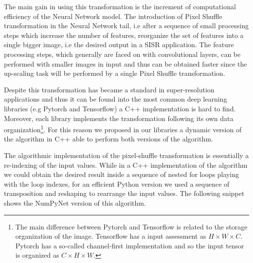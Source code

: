 \documentclass{standalone}
\begin{document}
The main gain in using this transformation is the increment of computational efficiency of the Neural Network model.
The introduction of Pixel Shuffle transformation in the Neural Network tail, i.e after a sequence of small processing steps which increase the number of features, reorganize the set of features into a single bigger image, i.e the desired output in a SISR application.
The feature processing steps, which generally are faced on with convolutional layers, can be performed with smaller images in input and thus can be obtained faster since the up-scaling task will be performed by a single Pixel Shuffle transformation.

Despite this transformation has became a standard in super-resolution applications and thus it can be found into the most common deep learning libraries (e.g \textsf{Pytorch} and \textsf{Tensorflow}) a \textsf{C++} implementation is hard to find.
Moreover, each library implements the transformation following its own data organization\footnote{
  The main difference between \textsf{Pytorch} and \textsf{Tensorflow} is related to the storage organization of the image.
  \textsf{Tensorflow} has a  input assessment as $H \times W \times C$.
  \textsf{Pytorch} has a so-called channel-first implementation and so the input tensor is organized as $C \times H \times W$.
}.
For this reason we proposed in our libraries a dynamic version of the algorithm in \textsf{C++} able to perform both versions of the algorithm.

The algorithmic implementation of the pixel-shuffle transformation is essentially a re-indexing of the input values.
While in a \textsf{C++} implementation of the algorithm we could obtain the desired result inside a sequence of nested for loops playing with the loop indexes, for an efficient \textsf{Python} version we used a sequence of transposition and reshaping to rearrange the input values.
The following snippet shows the \textsf{NumPyNet} version of this algorithm.
\end{document}
